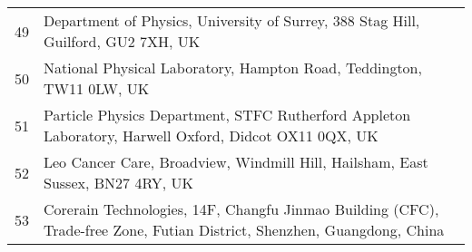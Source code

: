{\begin{tabular}{ c p{15cm} }
     49 & Department of Physics, University of Surrey, 388 Stag Hill, Guilford, GU2 7XH, UK\\
     50 & National Physical Laboratory, Hampton Road, Teddington, TW11 0LW, UK\\
     51 & Particle Physics Department, STFC Rutherford Appleton Laboratory, Harwell Oxford, Didcot OX11 0QX, UK\\
     52 & Leo Cancer Care, Broadview, Windmill Hill, Hailsham, East Sussex, BN27 4RY, UK\\
     53 & Corerain Technologies, 14F, Changfu Jinmao Building (CFC), Trade-free Zone, Futian District, Shenzhen, Guangdong, China\\
  \end{tabular}
}
